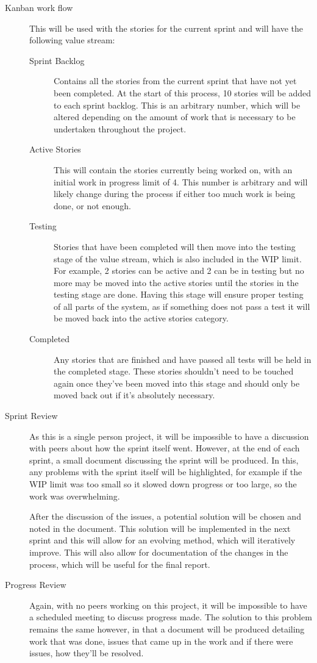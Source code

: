 \documentclass[11pt,fleqn,twoside]{article}
\begin{document}
\begin{description}
  \item[Kanban work flow]
    This will be used with the stories for the current sprint and will have the following value stream:
    \begin{description}
      \item[Sprint Backlog]
        Contains all the stories from the current sprint that have not yet been completed. At the start of this process, 10 stories will be added to each sprint backlog. This is an arbitrary number, which will be altered depending on the amount of work that is necessary to be undertaken throughout the project.
      \item[Active Stories]
        This will contain the stories currently being worked on, with an initial work in progress limit of 4. This number is arbitrary and will likely change during the process if either too much work is being done, or not enough.
      \item[Testing]
        Stories that have been completed will then move into the testing stage of the value stream, which is also included in the WIP limit. For example, 2 stories can be active and 2 can be in testing but no more may be moved into the active stories until the stories in the testing stage are done. Having this stage will ensure proper testing of all parts of the system, as if something does not pass a test it will be moved back into the active stories category.
      \item[Completed]
        Any stories that are finished and have passed all tests will be held in the completed stage. These stories shouldn't need to be touched again once they've been moved into this stage and should only be moved back out if it's absolutely necessary.
    \end{description}
  \item[Sprint Review]
    As this is a single person project, it will be impossible to have a discussion with peers about how the sprint itself went. However, at the end of each sprint, a small document discussing the sprint will be produced. In this, any problems with the sprint itself will be highlighted, for example if the WIP limit was too small so it slowed down progress or too large, so the work was overwhelming. 
    
    After the discussion of the issues, a potential solution will be chosen and noted in the document. This solution will be implemented in the next sprint and this will allow for an evolving method, which will iteratively improve. This will also allow for documentation of the changes in the process, which will be useful for the final report.
  \item[Progress Review]
     Again, with no peers working on this project, it will be impossible to have a scheduled meeting to discuss progress made. The solution to this problem remains the same however, in that a document will be produced detailing work that was done, issues that came up in the work and if there were issues, how they'll be resolved.\\
     

\end{description}
\end{document}
